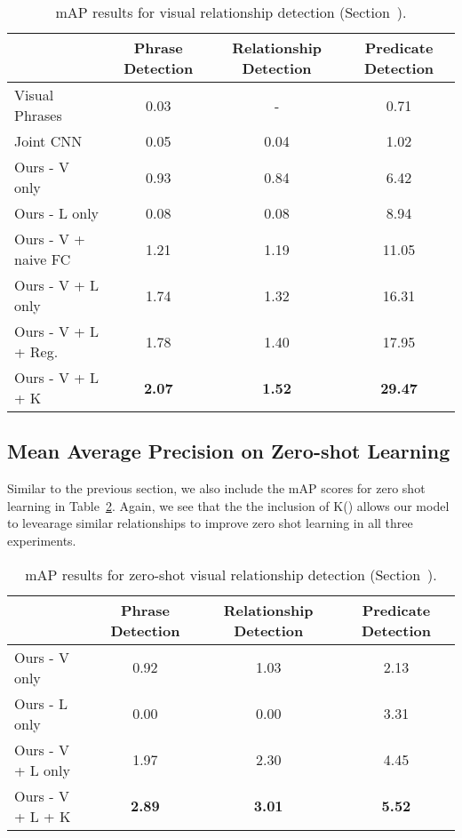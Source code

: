\documentclass[runningheads]{llncs}
\begin{document}
\begin{table}[t]
\centering
\small
\caption{mAP results for visual relationship detection (Section~).}
\label{tab:map_relationship_results}
\begin{tabular}{l  c  c    c}
         & Phrase Detection  & Relationship Detection & Predicate Detection \\
  \hline
  \hline
  Visual Phrases~\cite{sadeghi2011recognition}
                      & 0.03               & -               &   0.71 \\
  Joint CNN~\cite{simonyan2014very}
                      & 0.05               & 0.04            & 1.02     \\
  \hline
  \hline
  Ours - V only       & 0.93               & 0.84            & 6.42      \\
  Ours - L only       & 0.08               & 0.08            & 8.94      \\
  Ours - V + naive FC & 1.21               & 1.19            & 11.05    \\
 Ours - V + L only    & 1.74               &  1.32           & 16.31   \\
 Ours - V + L + Reg.  & 1.78               &  1.40           & 17.95   \\
 Ours - V + L + K     & \textbf{2.07}      & \textbf{1.52}   & \textbf{29.47}   \\
\hline
\end{tabular}
\end{table}

\subsection{Mean Average Precision on Zero-shot Learning}
Similar to the previous section, we also include the mAP scores for zero shot learning in Table~\ref{tab:map_zero_results}. Again, we see that the the inclusion of K() allows our model to levearage similar relationships to improve zero shot learning in all three experiments.

\begin{table}[t]
\begin{center}
\setlength{\tabcolsep}{4pt}
\caption{mAP results for zero-shot visual relationship detection (Section~).}
\label{tab:map_zero_results}
\begin{tabular}{l c c c }
         & Phrase Detection & Relationship Detection & Predicate Detection \\
        \hline
        \hline
        Ours - V only  & 0.92 & 1.03 & 2.13\\
        Ours - L only  & 0.00 & 0.00 & 3.31\\
        Ours - V + L only & 1.97 & 2.30 & 4.45\\
        Ours - V + L + K & \textbf{2.89} &  \textbf{3.01} & \textbf{5.52}\\
        \hline
\end{tabular}
\end{center}
\end{table}
\end{document}
